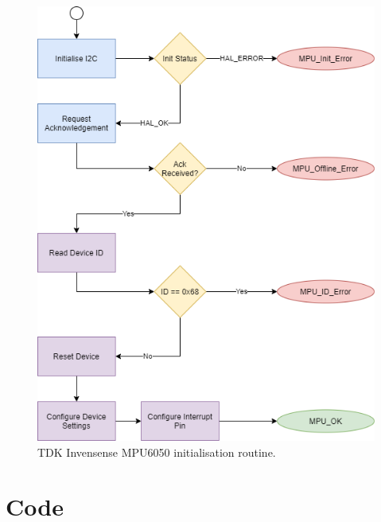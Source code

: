 \begin{figure}[H]
	\centering
	\includegraphics[scale=0.3]{MPU Init Diagram.png}
	\caption{TDK Invensense MPU6050 initialisation routine.}
	\label{fig:Init_diagram_mpu}
\end{figure}

\section{Code}


